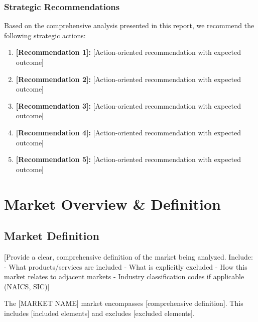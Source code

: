 \documentclass[11pt,letterpaper]{report}
\newcommand{\reporttitle}{[MARKET NAME]}
\begin{document}
\subsection{Strategic Recommendations}

Based on the comprehensive analysis presented in this report, we recommend the following strategic actions:

\begin{recommendationbox}
\begin{enumerate}
    \item \textbf{[Recommendation 1]:} [Action-oriented recommendation with expected outcome]
    \item \textbf{[Recommendation 2]:} [Action-oriented recommendation with expected outcome]
    \item \textbf{[Recommendation 3]:} [Action-oriented recommendation with expected outcome]
    \item \textbf{[Recommendation 4]:} [Action-oriented recommendation with expected outcome]
    \item \textbf{[Recommendation 5]:} [Action-oriented recommendation with expected outcome]
\end{enumerate}
\end{recommendationbox}

\chapter{Market Overview \& Definition}

\section{Market Definition}

[Provide a clear, comprehensive definition of the market being analyzed. Include:
- What products/services are included
- What is explicitly excluded
- How this market relates to adjacent markets
- Industry classification codes if applicable (NAICS, SIC)]

\begin{calloutbox}
The \reporttitle{} market encompasses [comprehensive definition]. This includes [included elements] and excludes [excluded elements].
\end{calloutbox}
\end{document}
